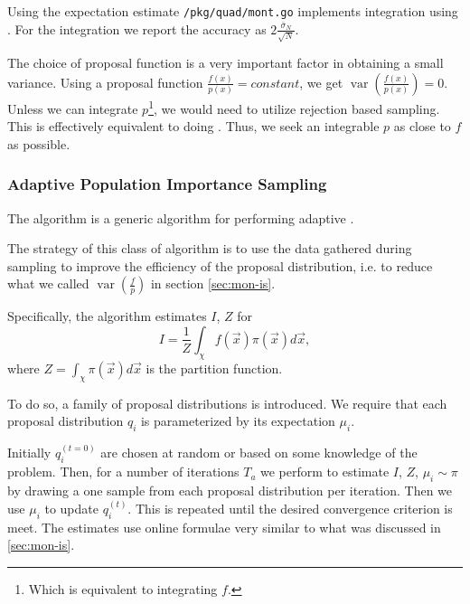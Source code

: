 \documentclass[10pt, a4paper]{article}
\begin{document}
  Using the expectation estimate \texttt{/pkg/quad/mont.go} implements integration using \is{}. For
  the \is{} integration we report the accuracy as $2\frac{\bar\sigma_N}{\sqrt N}$.

  The choice of proposal function is a very important factor in
  obtaining a small variance. Using a proposal function $\frac{f(x)}{p(x)} = constant$, we get
  $\operatorname{var}\left(\frac{f(x)}{p(x)}\right) = 0$. Unless we can integrate $p$\footnote{Which is
  equivalent to integrating $f$.}, we would need to utilize rejection based sampling. This is effectively
  equivalent to doing \is. Thus, we seek an integrable $p$ as close to $f$ as possible.

  \subsubsection{Adaptive Population Importance Sampling}
  The \apis{} algorithm is a generic algorithm for performing adaptive \is{}.

  The strategy of this class of algorithm is to use the data gathered during sampling to improve
  the efficiency of the proposal distribution, i.e. to reduce what we called
  $\operatorname{var}\left(\frac fp\right)$ in section \ref{sec:mon-is}.

  Specifically, the \apis{} algorithm estimates $I$, $Z$ for
  \begin{equation}
  I = \frac{1}{Z} \int_\chi f(\vec{x}) \pi(\vec{x}) d\vec{x},
  \end{equation}
  where $Z = \int_\chi \pi(\vec{x}) d\vec{x}$ is the partition function.

  To do so, a family of proposal distributions is introduced. We require that each proposal distribution
  $q_i$ is parameterized by its expectation $\mu_i$\cite{apis}\footnotemark.


  Initially $q_i^{(t=0)}$ are chosen at random or based on some knowledge of the problem. Then, for a number
  of iterations $T_a$ we perform \is{} to estimate $I$, $Z$, $\mu_i \sim \pi$ by drawing a one sample from each
  proposal distribution per iteration. Then we use $\mu_i$ to update $q_i^{(t)}$. This is repeated
  until the desired convergence criterion is meet. The estimates use online formulae very similar
  to what was discussed in \ref{sec:mon-is}.
\end{document}
